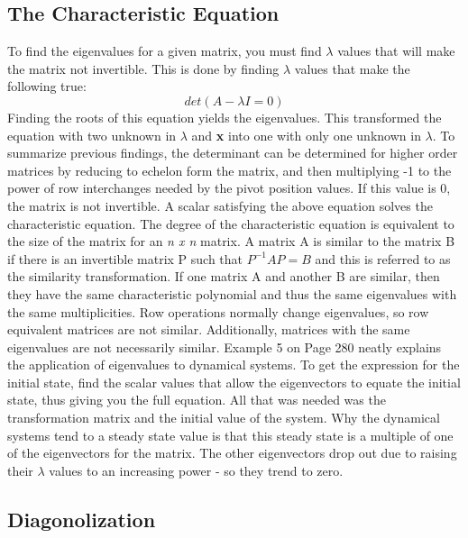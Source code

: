 \documentclass[12pt]{article}
\begin{document}
\subsection{The Characteristic Equation}
To find the eigenvalues for a given matrix, you must find $\lambda$ values that will make the matrix not invertible. This is done by finding $\lambda$ values that make the following true:
\newline
$$
det(A-\lambda I=0)
$$
\newline
Finding the roots of this equation yields the eigenvalues. This transformed the equation with two unknown in $\lambda$ and \textbf{x} into one with only one unknown in $\lambda$. To 
summarize previous findings, the determinant can be determined for higher order matrices by reducing to echelon form the matrix, and then multiplying -1 to the power of row interchanges 
needed by the pivot position values. If this value is 0, the matrix is not invertible. A scalar satisfying the above equation solves the characteristic equation. The degree of the 
characteristic equation is equivalent to the size of the matrix for an \textit{n x n} matrix. 
\newline
\newline
A matrix A is similar to the matrix B if there is an invertible matrix P such that $P^{-1}AP=B$ and this is referred to as the similarity transformation. If one matrix A and another B are 
similar, then they have the same characteristic polynomial and thus the same eigenvalues with the same multiplicities. Row operations normally change eigenvalues, so row equivalent 
matrices are not similar. Additionally, matrices with the same eigenvalues are not necessarily similar. Example 5 on Page 280 neatly explains the application of eigenvalues to 
dynamical systems. To get the expression for the initial state, find the scalar values that allow the eigenvectors to equate the initial state, thus giving you the full equation. 
All that was needed was the transformation matrix and the initial value of the system. Why the dynamical systems tend to a steady state value is that this steady state is a multiple 
of one of the eigenvectors for the matrix. The other eigenvectors drop out due to raising their $\lambda$ values to an increasing power - so they trend to zero. 
\subsection{Diagonolization}
\end{document}
